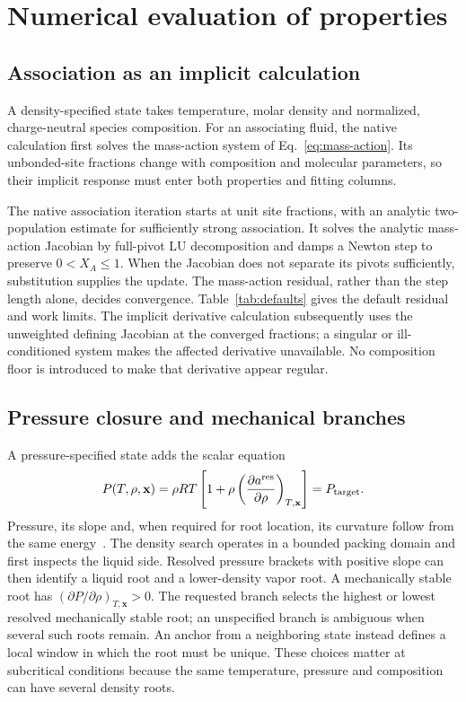 \section{Numerical evaluation of properties}
\label{sec:state}
\subsection{Association as an implicit calculation}
A density-specified state takes temperature, molar density and normalized, charge-neutral species composition.
For an associating fluid, the native calculation first solves the mass-action system of Eq.~\eqref{eq:mass-action}.
Its unbonded-site fractions change with composition and molecular parameters, so their implicit response must enter both properties and fitting columns.

The native association iteration starts at unit site fractions, with an analytic two-population estimate for sufficiently strong association.
It solves the analytic mass-action Jacobian by full-pivot LU decomposition and damps a Newton step to preserve $0<X_A\le1$.
When the Jacobian does not separate its pivots sufficiently, substitution supplies the update.
The mass-action residual, rather than the step length alone, decides convergence.
Table~\ref{tab:defaults} gives the default residual and work limits.
The implicit derivative calculation subsequently uses the unweighted defining Jacobian at the converged fractions; a singular or ill-conditioned system makes the affected derivative unavailable.
No composition floor is introduced to make that derivative appear regular.

\subsection{Pressure closure and mechanical branches}
A pressure-specified state adds the scalar equation
\begin{equation}
P(T,\rho,\mathbf{x})=\rho RT\left[1+\rho\left(\frac{\partial a^{\mathrm{res}}}{\partial\rho}\right)_{T,\mathbf{x}}\right]=P_{\mathrm{target}}.
\label{eq:pressure-closure}
\end{equation}
Pressure, its slope and, when required for root location, its curvature follow from the same energy~\citep{Gross2001}.
The density search operates in a bounded packing domain and first inspects the liquid side.
Resolved pressure brackets with positive slope can then identify a liquid root and a lower-density vapor root.
A mechanically stable root has $(\partial P/\partial\rho)_{T,\mathbf{x}}>0$.
The requested branch selects the highest or lowest resolved mechanically stable root; an unspecified branch is ambiguous when several such roots remain.
An anchor from a neighboring state instead defines a local window in which the root must be unique.
These choices matter at subcritical conditions because the same temperature, pressure and composition can have several density roots.

